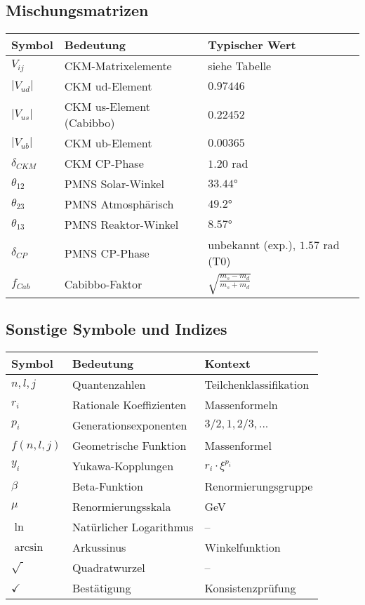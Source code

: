 \documentclass[12pt,a4paper]{article}
\begin{document}
	\subsection{Mischungsmatrizen}
	
	\begin{longtable}{lll}
		\toprule
		\textbf{Symbol} & \textbf{Bedeutung} & \textbf{Typischer Wert} \\
		\midrule
		$V_{ij}$ & CKM-Matrixelemente & siehe Tabelle \\
		$|V_{ud}|$ & CKM ud-Element & $0.97446$ \\
		$|V_{us}|$ & CKM us-Element (Cabibbo) & $0.22452$ \\
		$|V_{ub}|$ & CKM ub-Element & $0.00365$ \\
		$\delta_{CKM}$ & CKM CP-Phase & $1.20$ rad \\
		$\theta_{12}$ & PMNS Solar-Winkel & $33.44°$ \\
		$\theta_{23}$ & PMNS Atmosphärisch & $49.2°$ \\
		$\theta_{13}$ & PMNS Reaktor-Winkel & $8.57°$ \\
		$\delta_{CP}$ & PMNS CP-Phase & unbekannt (exp.), $1.57$ rad (T0) \\
		$f_{Cab}$ & Cabibbo-Faktor & $\sqrt{\frac{m_s - m_d}{m_s + m_d}}$ \\
		\bottomrule
	\end{longtable}
	
	\subsection{Sonstige Symbole und Indizes}
	
	\begin{longtable}{lll}
		\toprule
		\textbf{Symbol} & \textbf{Bedeutung} & \textbf{Kontext} \\
		\midrule
		$n, l, j$ & Quantenzahlen & Teilchenklassifikation \\
		$r_i$ & Rationale Koeffizienten & Massenformeln \\
		$p_i$ & Generationsexponenten & $3/2, 1, 2/3, ...$ \\
		$f(n,l,j)$ & Geometrische Funktion & Massenformel \\
		$y_i$ & Yukawa-Kopplungen & $r_i \cdot \xi^{p_i}$ \\
		$\beta$ & Beta-Funktion & Renormierungsgruppe \\
		$\mu$ & Renormierungsskala & GeV \\
		$\ln$ & Natürlicher Logarithmus & -- \\
		$\arcsin$ & Arkussinus & Winkelfunktion \\
		$\sqrt{\ }$ & Quadratwurzel & -- \\
		$\checkmark$ & Bestätigung & Konsistenzprüfung \\
		\bottomrule
	\end{longtable}
	
\end{document}
